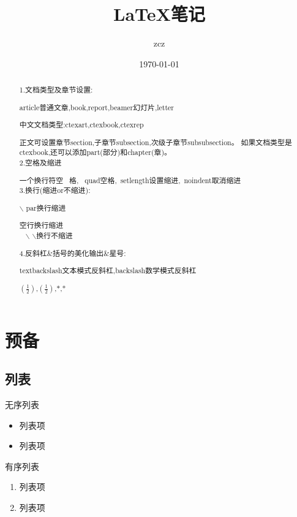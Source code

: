 \documentclass[12pt]{ctexart}
\title{\heiti \LaTeX 笔记}
\author{\kaishu zcz}
\date{\today}
\begin{document}
	
\maketitle
\thispagestyle{empty}
\tableofcontents
\newpage
\setcounter{page}{1}


\begin{abstract}
	
\setlength	%
1.文档类型及章节设置:
\par article普通文章,book,report,beamer幻灯片,letter
\par 中文文档类型:ctexart,ctexbook,ctexrep
\par 正文可设置章节section,子章节subsection,次级子章节subsubsection。
如果文档类型是ctexbook,还可以添加part(部分)和chapter(章)。\\

2.空格及缩进\par
一个换行符空 \ 格,
{\ quad空格},\ setlength设置缩进,\ noindent取消缩进\\

3.换行(缩进or不缩进):\par
{$\backslash$ par换行缩进}

{空行换行缩进}
~\\ 
{~ $\backslash$ $\backslash$换行不缩进\\}

4.反斜杠\&括号的美化输出\&星号:\par
textbackslash文本模式反斜杠,backslash数学模式反斜杠

$(\frac{1}{2})$,$\left ( \frac{1}{2} \right )$,$\ast$,*

\end{abstract}
\newpage


\section{预备}

\subsection{列表}
\par 无序列表
\begin{itemize}
	\item 列表项	
	\item 列表项
\end{itemize}
\par 有序列表
\begin{enumerate}
	\item 列表项	
	\item 列表项
\end{enumerate}
\end{document}
